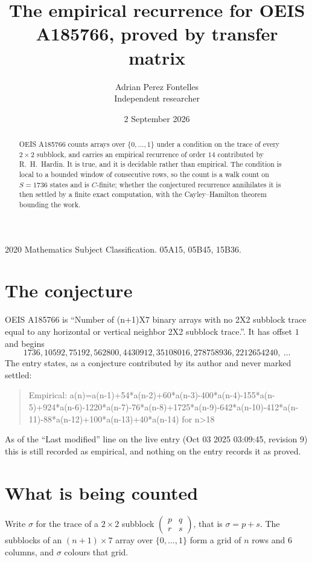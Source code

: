 \documentclass[11pt,a4paper]{article}
\title{The empirical recurrence for OEIS A185766, proved by transfer matrix}
\author{Adrian Perez Fontelles\\ \small Independent researcher}
\date{2 September 2026}
\theoremstyle{plain}
\theoremstyle{definition}
\begin{document}
\maketitle

\begin{abstract}
OEIS A185766 counts arrays over $\{0,\dots,1\}$ under a condition on the trace of every
$2\times2$ subblock, and carries an empirical recurrence of order $14$ contributed by
R.~H.~Hardin. It is true, and it is decidable rather than empirical. The condition is local to
a bounded window of consecutive rows, so the count is a walk count on $S=1736$ states and is
$C$-finite; whether the conjectured recurrence annihilates it is then settled by a finite exact
computation, with the Cayley--Hamilton theorem bounding the work.
\end{abstract}

\noindent\small 2020 Mathematics Subject Classification. 05A15, 05B45, 15B36.\normalsize

\section{The conjecture}

OEIS A185766 is ``Number of (n+1)X7 binary arrays with no 2X2 subblock trace equal to any horizontal or vertical neighbor 2X2 subblock trace.''. It has offset $1$ and begins
\[
1736, 10592, 75192, 562800, 4430912, 35108016, 278758936, 2212654240,\ \dots
\]
The entry states, as a conjecture contributed by its author and never marked settled:
\begin{quote}
Empirical: a(n)=a(n-1)+54*a(n-2)+60*a(n-3)-400*a(n-4)-155*a(n-5)+924*a(n-6)-1220*a(n-7)-76*a(n-8)+1725*a(n-9)-642*a(n-10)-412*a(n-11)-88*a(n-12)+100*a(n-13)+40*a(n-14) for n>18
\end{quote}
As of the ``Last modified'' line on the live entry (Oct 03 2025 03:09:45, revision 9) this is still
recorded as empirical, and nothing on the entry records it as proved.

\section{What is being counted}

Write $\sigma$ for the trace of a $2\times2$ subblock
$\begin{pmatrix}p&q\\r&s\end{pmatrix}$, that is $\sigma=p+s$. The subblocks of an
$(n+1)\times7$ array over $\{0,\dots,1\}$ form a grid of $n$ rows and $6$
columns, and $\sigma$ colours that grid.
\end{document}
